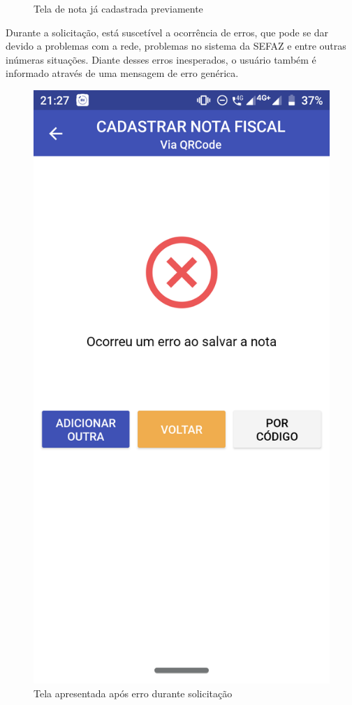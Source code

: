 \begin{figure}[h]
    \caption{Tela de nota já cadastrada previamente}
    \label{appQRCodeJaCadastradaFig}
\end{figure}

\newpage
Durante a solicitação, está suscetível a ocorrência de erros, que pode se dar devido a problemas com a rede, problemas no sistema da SEFAZ e entre outras inúmeras situações. Diante desses erros inesperados, o usuário também é informado através de uma mensagem de erro genérica.

\begin{figure}[h]
    \centering
    \includegraphics[scale=0.15]{tcc/figures/app/app_codigo_qrcode_erro.png}
    \caption{Tela apresentada após erro durante solicitação}
    \label{appQRCodeErroFig}
\end{figure}

